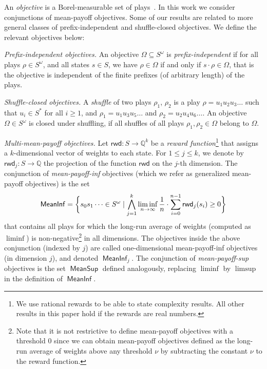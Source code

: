 \documentclass{article}
\newcommand{\sbcustom}[2]{\scalebox{1}[1]{#2}}
\newcommand{\rat}{\mathbb Q}
\newcommand{\rwd}{\mathsf{rwd}}
\newcommand{\MeanSup}{\operatorname{\mathsf{MeanSup}}}
\newcommand{\MeanInf}{\operatorname{\mathsf{MeanInf}}}
\begin{document}
\smallskip{}
An {\em objective} is a Borel-measurable set of plays~\cite{Billingsley}.
In this work we consider conjunctions of mean-payoff objectives. 
Some of our results are related to more general classes of prefix-independent
and shuffle-closed objectives.
We define the relevant objectives below:
\smallskip
\begin{compactenum}
\item {\em Prefix-independent objectives.}
An objective $\Omega \subseteq S^\omega$ is \emph{prefix-independent} if for all plays $\rho \in S^\omega$,
and all states $s \in S$, we have $\rho \in \Omega$ if and only if $s \cdot \rho \in \Omega$,
that is the objective is independent of the finite prefixes (of arbitrary length) 
of the plays.

\item {\em Shuffle-closed objectives.} 
A \emph{shuffle} of two plays $\rho_1$, $\rho_2$ is a play $\rho = u_1 u_2 u_3 \dots$
such that $u_i \in S^*$  for all $i \geq 1$, and 
$\rho_1 = u_1 u_3 u_5 \dots$ and $\rho_2 = u_2 u_4 u_6 \dots$.
An objective $\Omega \in S^{\omega}$ is closed under shuffling, 
if all shuffles of all plays $\rho_1, \rho_2 \in \Omega$ belong to $\Omega$.

\item {\em Multi-mean-payoff objectives.}
Let $\rwd: S \to \rat^k$ be a \emph{reward function}\footnote{We use rational
rewards to be able to state complexity results. All other results in this paper
hold if the rewards are real numbers.} 
that assigns a $k$-dimensional vector of weights to each state. 
For $1 \leq j \leq k$, we denote by $\rwd_j: S \to \rat$ the projection of 
the function $\rwd$ on the $j$-th dimension.
The conjunction of \emph{mean-payoff-inf} objectives (which we refer as generalized 
mean-payoff objectives) is the set  
$$
\sbcustom{.95}{$\displaystyle
\MeanInf=
 \bigg\{
  s_0s_1\cdots \in S^\omega
  \mid 
  \bigwedge_{j=1}^{k} \liminf_{n \to \infty} \frac{1}{n} \cdot \sum_{i = 0}^{n-1}\rwd_j(s_{i}) \geq 0 
  \bigg\}
$}
$$
that contains all plays for which the long-run average of weights (computed as $\liminf$)
is non-negative\footnote{Note that it is not restrictive to define mean-payoff objectives with a threshold $0$
since we can obtain mean-payoff objectives defined as the long-run average of weights 
above any threshold $\nu$ by subtracting the constant $\nu$ to the reward function.} 
in all dimensions. 
The objectives inside the above conjunction (indexed by $j$) are called 
one-dimensional mean-payoff-inf objectives (in dimension $j$), and denoted $\MeanInf_j$.
The conjunction of \emph{mean-payoff-sup} objectives is the set $\MeanSup$ 
defined analogously, replacing $\liminf$ by $\limsup$ in the definition of $\MeanInf$.
\end{compactenum}
\end{document}
